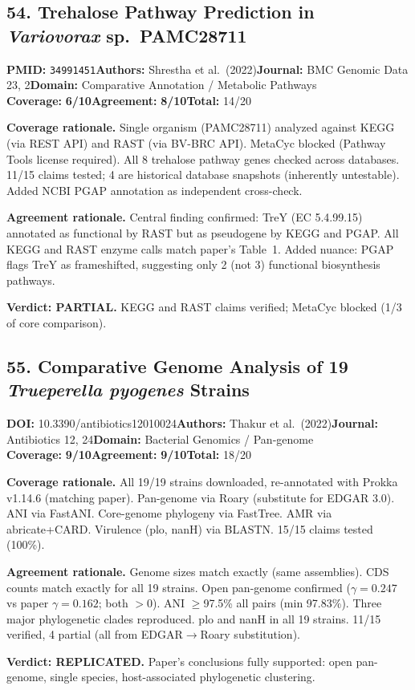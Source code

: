 \documentclass[11pt]{article}
\newcommand{\scorebadge}[2]{\textbf{#1:} \textbf{#2/10}}
\begin{document}
\subsection{54. Trehalose Pathway Prediction in \textit{Variovorax} sp.\ PAMC28711}
\textbf{PMID:} \texttt{34991451}\quad\textbf{Authors:} Shrestha et al.\ (2022)\quad\textbf{Journal:} BMC Genomic Data 23, 2\quad\textbf{Domain:} Comparative Annotation / Metabolic Pathways\\
\scorebadge{Coverage}{6}\quad\scorebadge{Agreement}{8}\quad\textbf{Total:} 14/20\par\smallskip
\noindent\textbf{Coverage rationale.} Single organism (PAMC28711) analyzed against KEGG (via REST API) and RAST (via BV-BRC API). MetaCyc blocked (Pathway Tools license required). All 8 trehalose pathway genes checked across databases. 11/15 claims tested; 4 are historical database snapshots (inherently untestable). Added NCBI PGAP annotation as independent cross-check.\par
\noindent\textbf{Agreement rationale.} Central finding confirmed: TreY (EC 5.4.99.15) annotated as functional by RAST but as pseudogene by KEGG and PGAP. All KEGG and RAST enzyme calls match paper's Table~1. Added nuance: PGAP flags TreY as frameshifted, suggesting only 2 (not 3) functional biosynthesis pathways.\par\smallskip
\noindent\textbf{Verdict: PARTIAL.} KEGG and RAST claims verified; MetaCyc blocked (1/3 of core comparison).

\subsection{55. Comparative Genome Analysis of 19 \textit{Trueperella pyogenes} Strains}
\textbf{DOI:} 10.3390/antibiotics12010024\quad\textbf{Authors:} Thakur et al.\ (2022)\quad\textbf{Journal:} Antibiotics 12, 24\quad\textbf{Domain:} Bacterial Genomics / Pan-genome\\
\scorebadge{Coverage}{9}\quad\scorebadge{Agreement}{9}\quad\textbf{Total:} 18/20\par\smallskip
\noindent\textbf{Coverage rationale.} All 19/19 strains downloaded, re-annotated with Prokka v1.14.6 (matching paper). Pan-genome via Roary (substitute for EDGAR 3.0). ANI via FastANI. Core-genome phylogeny via FastTree. AMR via abricate+CARD. Virulence (plo, nanH) via BLASTN. 15/15 claims tested (100\%).\par
\noindent\textbf{Agreement rationale.} Genome sizes match exactly (same assemblies). CDS counts match exactly for all 19 strains. Open pan-genome confirmed ($\gamma=0.247$ vs paper $\gamma=0.162$; both $>0$). ANI $\geq$97.5\% all pairs (min 97.83\%). Three major phylogenetic clades reproduced. plo and nanH in all 19 strains. 11/15 verified, 4 partial (all from EDGAR$\to$Roary substitution).\par\smallskip
\noindent\textbf{Verdict: REPLICATED.} Paper's conclusions fully supported: open pan-genome, single species, host-associated phylogenetic clustering.
\end{document}
